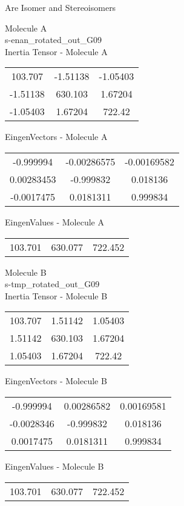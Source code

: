 \begin{center}
\vtab
\vtab
\textcolor{NavyBlue}{\Large Are Isomer and Stereoisomers}
\end{center}
\newpage
\begin{multicols}{2}
\begin{center}
Molecule A \\ 
s-enan\_rotated\_out\_G09
\\
Inertia Tensor - Molecule A \\
\vtab
\begin{tabular}{|c c c|}
103.707	 & 	-1.51138	 & 	-1.05403	 \\
-1.51138	 & 	630.103	 & 	1.67204	 \\
-1.05403	 & 	1.67204	 & 	722.42
\end{tabular}

\vtab
 EingenVectors - Molecule A     \\
\vtab
\begin{tabular}{|c c c|}
-0.999994	 & 	-0.00286575	 & 	-0.00169582	 \\
0.00283453	 & 	-0.999832	 & 	0.018136	 \\
-0.0017475	 & 	0.0181311	 & 	0.999834
\end{tabular}

\vtab
 EingenValues - Molecule A     \\
\vtab
\begin{tabular}{|c c c|}
103.701	 & 	630.077	 & 	722.452
\end{tabular}
\columnbreak

Molecule B \\ 
s-tmp\_rotated\_out\_G09
\\
Inertia Tensor - Molecule B \\
\vtab
\begin{tabular}{|c c c|}
103.707	 & 	1.51142	 & 	1.05403	 \\
1.51142	 & 	630.103	 & 	1.67204	 \\
1.05403	 & 	1.67204	 & 	722.42
\end{tabular}

\vtab
 EingenVectors - Molecule B     \\
\vtab
\begin{tabular}{|c c c|}
-0.999994	 & 	0.00286582	 & 	0.00169581	 \\
-0.0028346	 & 	-0.999832	 & 	0.018136	 \\
0.0017475	 & 	0.0181311	 & 	0.999834
\end{tabular}

\vtab
 EingenValues - Molecule B     \\
\vtab
\begin{tabular}{|c c c|}
103.701	 & 	630.077	 & 	722.452
\end{tabular}

\end{center}
\end{multicols}
